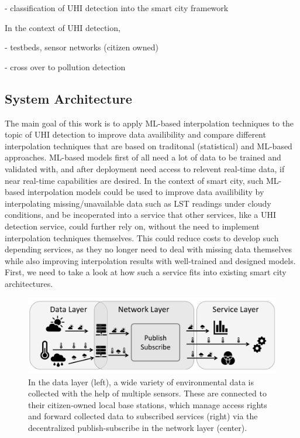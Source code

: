 - classification of UHI detection into the smart city framework

In the context of UHI detection,

- testbeds, sensor networks (citizen owned)

- cross over to pollution detection

\subsection{System Architecture}
\label{chap:System Architecture}


The main goal of this work is to apply ML-based interpolation techniques to the topic of UHI detection to improve data availibility and compare different interpolation techniques that are based on traditonal (statistical) and ML-based approaches. ML-based models first of all need a lot of data to be trained and validated with, and after deployment need access to relevent real-time data, if near real-time capabilities are desired. In the context of smart city, such ML-based interpolation models could be used to improve data availibility by interpolating missing/unavailable data such as LST readings under cloudy conditions, and be incoperated into a service that other services, like a UHI detection service, could further rely on, without the need to implement interpolation techniques themselves. This could reduce costs to develop such depending services, as they no longer need to deal with missing data themselves while also improving interpolation results with well-trained and designed models. First, we need to take a look at how such a service fits into existing smart city architectures.

\begin{figure}[h]
    \centering
    \includegraphics[width=\textwidth]{images/expose-system-architecture.png}
    \caption{In the data layer (left), a wide variety of environmental data is collected with the help of multiple sensors. These are connected to their citizen-owned local base stations, which manage access rights and forward collected data to subscribed services (right) via the decentralized publish-subscribe in the network layer (center).}
    \label{fig:system-architecture-overview} %
\end{figure}

